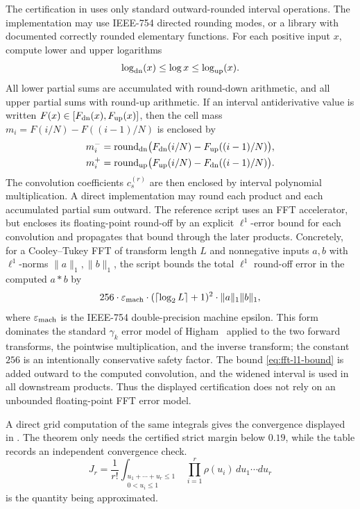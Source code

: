 The certification in  uses only standard
outward-rounded interval operations.  The implementation may use IEEE-754
directed rounding modes, or a library with documented correctly rounded
elementary functions.  For each positive input $x$, compute lower and upper
logarithms
\[
  \log_{\rm dn}(x)\le \log x\le \log_{\rm up}(x).
\]
All lower partial sums are accumulated with round-down arithmetic, and all
upper partial sums with round-up arithmetic.  If an interval antiderivative
value is written $F(x)\in[F_{\rm dn}(x),F_{\rm up}(x)]$, then the cell mass
$m_i=F(i/N)-F((i-1)/N)$ is enclosed by
\[
\begin{aligned}
  m_i^-&=\operatorname{round}_{\rm dn}
  \bigl(F_{\rm dn}(i/N)-F_{\rm up}((i-1)/N)\bigr),\\
  m_i^+&=\operatorname{round}_{\rm up}
  \bigl(F_{\rm up}(i/N)-F_{\rm dn}((i-1)/N)\bigr).
\end{aligned}
\]
The convolution coefficients $c_s^{(r)}$ are then enclosed by interval
polynomial multiplication.  A direct implementation may round each product and
each accumulated partial sum outward.  The reference script uses an FFT
accelerator, but encloses its floating-point round-off by an explicit
$\ell^1$-error bound for each convolution and propagates that bound through the
later products.  Concretely, for a Cooley--Tukey FFT of transform length $L$
and nonnegative inputs $a,b$ with $\ell^1$-norms $\|a\|_1,\|b\|_1$, the script
bounds the total $\ell^1$ round-off error in the computed $a*b$ by
\begin{equation}\label{eq:fft-l1-bound}
  256\cdot\varepsilon_{\rm mach}\cdot
  (\lceil\log_2 L\rceil+1)^2\cdot\|a\|_1\|b\|_1,
\end{equation}
where $\varepsilon_{\rm mach}$ is the IEEE-754 double-precision machine
epsilon.  This form dominates the standard $\gamma_k$ error model of
Higham~\cite[Chapter~24]{Higham02} applied to the two forward transforms, the
pointwise multiplication, and the inverse transform; the constant $256$ is an
intentionally conservative safety factor.  The bound
\eqref{eq:fft-l1-bound} is added outward to the computed convolution, and the
widened interval is used in all downstream products.  Thus the displayed
certification does not rely on an unbounded floating-point FFT error model.

A direct grid computation of the same integrals gives the convergence displayed
in .  The theorem only needs the certified strict
margin below $0.19$, while the table records an independent convergence check.
\[
  J_r=
  \frac1{r!}
  \int_{\substack{u_1+\cdots+u_r\le1\\0<u_i\le1}}
  \prod_{i=1}^r \rho(u_i)\,du_1\cdots du_r
\]
is the quantity being approximated.

